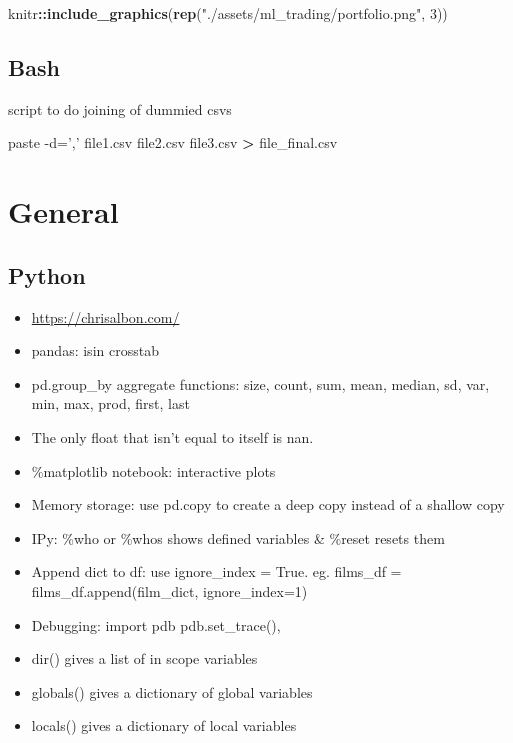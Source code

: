 \documentclass[]{book}
\newenvironment{Shaded}{\begin{snugshade}}{\end{snugshade}}
\newcommand{\KeywordTok}[1]{\textcolor[rgb]{0.13,0.29,0.53}{\textbf{#1}}}
\newcommand{\DecValTok}[1]{\textcolor[rgb]{0.00,0.00,0.81}{#1}}
\newcommand{\StringTok}[1]{\textcolor[rgb]{0.31,0.60,0.02}{#1}}
\newcommand{\OperatorTok}[1]{\textcolor[rgb]{0.81,0.36,0.00}{\textbf{#1}}}
\newcommand{\ExtensionTok}[1]{#1}
\newcommand{\NormalTok}[1]{#1}
\theoremstyle{definition}
\theoremstyle{definition}
\theoremstyle{definition}
\theoremstyle{remark}
\begin{document}
\begin{Shaded}
\begin{Highlighting}[]
\NormalTok{knitr}\OperatorTok{::}\KeywordTok{include_graphics}\NormalTok{(}\KeywordTok{rep}\NormalTok{(}\StringTok{"./assets/ml_trading/portfolio.png"}\NormalTok{, }\DecValTok{3}\NormalTok{))}
\end{Highlighting}
\end{Shaded}

\section{Bash}\label{bash}

script to do joining of dummied csvs

\begin{Shaded}
\begin{Highlighting}[]
\ExtensionTok{paste}\NormalTok{ -d=}\StringTok{','}\NormalTok{ file1.csv file2.csv file3.csv }\OperatorTok{>}\NormalTok{ file_final.csv}
\end{Highlighting}
\end{Shaded}

\chapter{General}\label{general-7}

\section{Python}\label{python-1}

\begin{itemize}
\item
  \url{https://chrisalbon.com/}
\item
  pandas: isin \textbar{} crosstab
\item
  pd.group\_by aggregate functions: size, count, sum, mean, median, sd,
  var, min, max, prod, first, last
\item
  The only float that isn't equal to itself is nan.
\item
  \%matplotlib notebook: interactive plots
\item
  Memory storage: use pd.copy to create a deep copy instead of a shallow
  copy
\item
  IPy: \%who or \%whos shows defined variables \& \%reset resets them
\item
  Append dict to df: use ignore\_index = True. eg. films\_df =
  films\_df.append(film\_dict, ignore\_index=1)
\item
  Debugging: import pdb \textbar{} pdb.set\_trace(),
\item
  dir() gives a list of in scope variables
\item
  globals() gives a dictionary of global variables
\item
  locals() gives a dictionary of local variables
\end{itemize}
\end{document}
